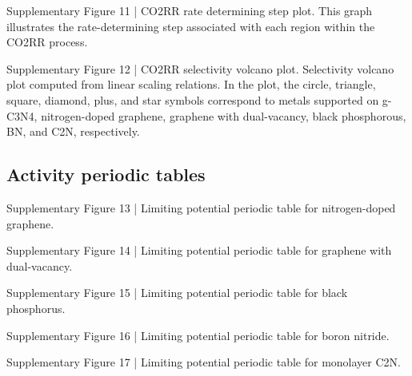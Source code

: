 Supplementary Figure 11 | CO2RR rate determining step plot. This graph illustrates the rate-determining step associated with each region within the CO2RR process.


Supplementary Figure 12 | CO2RR selectivity volcano plot. Selectivity volcano plot computed from linear scaling relations. In the plot, the circle, triangle, square, diamond, plus, and star symbols correspond to metals supported on g-C3N4, nitrogen-doped graphene, graphene with dual-vacancy, black phosphorous, BN, and C2N, respectively.


\subsection{Activity periodic tables}


Supplementary Figure 13 | Limiting potential periodic table for nitrogen-doped graphene.


Supplementary Figure 14 | Limiting potential periodic table for graphene with dual-vacancy.


Supplementary Figure 15 | Limiting potential periodic table for black phosphorus.


Supplementary Figure 16 | Limiting potential periodic table for boron nitride.


Supplementary Figure 17 | Limiting potential periodic table for monolayer C2N.
